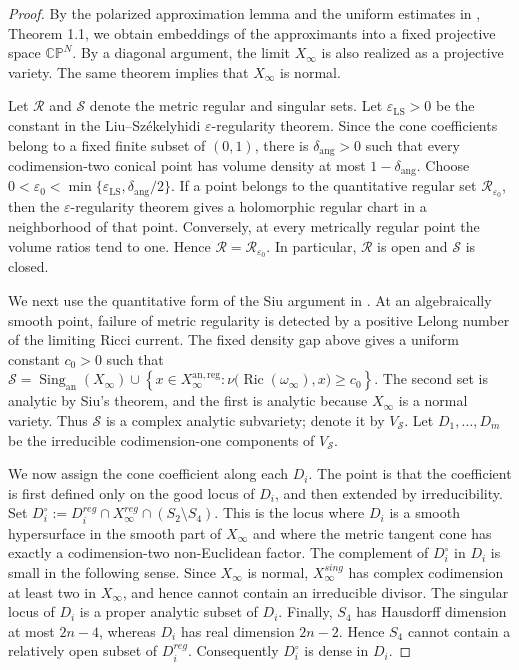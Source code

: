 \documentclass[11pt]{amsart}
\theoremstyle{definition}
\theoremstyle{remark}
\begin{document}
\begin{proof}
By the polarized approximation lemma and the uniform estimates in \cite{SLI}, Theorem 1.1, we obtain embeddings of the approximants into a fixed projective space $\mathbb{CP}^N$. By a diagonal argument, the limit $X_\infty$ is also realized as a projective variety. The same theorem implies that $X_\infty$ is normal.

Let $\mathcal R$ and $\mathcal S$ denote the metric regular and singular sets.
Let $\varepsilon_{\mathrm{LS}}>0$ be the constant in the
Liu--Sz\'ekelyhidi $\varepsilon$-regularity theorem. Since the cone
coefficients belong to a fixed finite subset of $(0,1)$, there is
$\delta_{\mathrm{ang}}>0$ such that every codimension-two conical point has
volume density at most $1-\delta_{\mathrm{ang}}$. Choose $0<\varepsilon_0<
 \min\{\varepsilon_{\mathrm{LS}},\delta_{\mathrm{ang}}/2\}$.
If a point belongs to the quantitative regular set $\mathcal R_{\varepsilon_0}$,
then the $\varepsilon$-regularity theorem gives a holomorphic regular chart in
a neighborhood of that point. Conversely, at every metrically regular point
the volume ratios tend to one. Hence $\mathcal R=\mathcal R_{\varepsilon_0}$.
In particular, $\mathcal R$ is open and $\mathcal S$ is closed.

We next use the quantitative form of the Siu argument in
\cite[Section~4]{SLI}. At an algebraically smooth point, failure of metric
regularity is detected by a positive Lelong number of the limiting Ricci
current. The fixed density gap above gives a uniform constant $c_0>0$ such
that $\mathcal S
=
\operatorname{Sing}_{\mathrm{an}}(X_\infty)
\cup
\left\{
 x\in X_\infty^{\mathrm{an,reg}}:
 \nu\bigl(\operatorname{Ric}(\omega_\infty),x\bigr)\ge c_0
\right\}.
$
The second set is analytic by Siu's theorem, and the first is analytic because
$X_\infty$ is a normal variety. Thus $\mathcal S$ is a complex analytic
subvariety; denote it by $V_{\mathcal S}$. Let $D_1,\ldots,D_m$ be the
irreducible codimension-one components of $V_{\mathcal S}$.

We now assign the cone coefficient along each $D_i$. The point is that the coefficient is first defined only on the good locus of $D_i$, and then extended by irreducibility. Set
$D_i^\circ:=D_i^{reg}\cap X_\infty^{reg}\cap(S_2\setminus S_4)$.
This is the locus where $D_i$ is a smooth hypersurface in the smooth part of $X_\infty$ and where the metric tangent cone has exactly a codimension-two non-Euclidean factor. The complement of $D_i^\circ$ in $D_i$ is small in the following sense. Since $X_\infty$ is normal, $X_\infty^{sing}$ has complex codimension at least two in $X_\infty$, and hence cannot contain an irreducible divisor. The singular locus of $D_i$ is a proper analytic subset of $D_i$. Finally, $S_4$ has Hausdorff dimension at most $2n-4$, whereas $D_i$ has real dimension $2n-2$. Hence $S_4$ cannot contain a relatively open subset of $D_i^{reg}$. Consequently $D_i^\circ$ is dense in $D_i$.


\end{proof}
\end{document}
